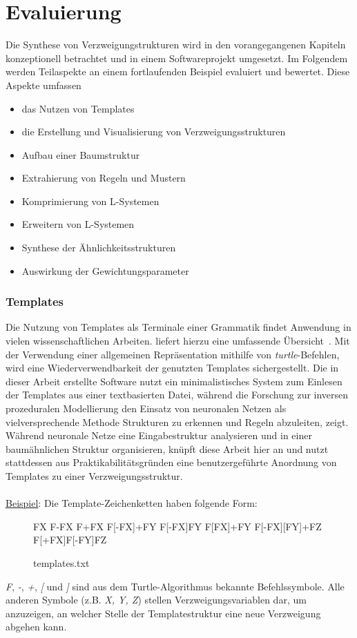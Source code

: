 
\chapter{Evaluierung}
\label{eval}
Die Synthese von Verzweigungstrukturen wird in den vorangegangenen Kapiteln konzeptionell betrachtet
und in einem Softwareprojekt umgesetzt.
Im Folgendem werden Teilaspekte an einem fortlaufenden Beispiel evaluiert und bewertet.
Diese Aspekte umfassen
\begin{itemize}
    \item das Nutzen von Templates
    \item die Erstellung und Visualisierung von Verzweigungsstrukturen
    \item Aufbau einer Baumstruktur
    \item Extrahierung von Regeln und Mustern
    \item Komprimierung von L-Systemen
    \item Erweitern von L-Systemen
    \item Synthese der Ähnlichkeitsstrukturen
    \item Auswirkung der Gewichtungsparameter
\end{itemize}

\subsection*{Templates}
Die Nutzung von Templates als Terminale einer Grammatik findet Anwendung in vielen wissenschaftlichen Arbeiten.
\citeauthor{aliaga_2016} liefert hierzu eine umfassende Übersicht~\cite{aliaga_2016}.
Mit der Verwendung einer allgemeinen Repräsentation mithilfe von \textit{turtle}-Befehlen, wird eine
Wiederverwendbarkeit der genutzten Templates sichergestellt.
Die in dieser Arbeit erstellte Software nutzt ein minimalistisches System zum Einlesen der Templates aus
einer textbasierten Datei, während die Forschung zur inversen prozeduralen Modellierung den Einsatz von
neuronalen Netzen als vielversprechende Methode Strukturen zu erkennen und Regeln abzuleiten, zeigt.\\
Während neuronale Netze eine Eingabestruktur analysieren und in einer baumähnlichen Struktur organisieren,
knüpft diese Arbeit hier an und nutzt stattdessen aus Praktikabilitätsgründen eine benutzergeführte Anordnung
von Templates zu einer Verzweigungsstruktur.\\~\\
\underline{Beispiel}: Die Template-Zeichenketten haben folgende Form:
\begin{figure}[H]
    \centering
    \begin{csource}
    FX
    F-FX
    F+FX
    F[-FX]+FY
    F[-FX]FY
    F[FX]+FY
    F[-FX][FY]+FZ
    F[+FX]F[-FY]FZ
    \end{csource}
    \caption{templates.txt}
\end{figure}
\textit{F}, \textit{-}, \textit{+}, \textit{[} und \textit{]} sind aus dem Turtle-Algorithmus bekannte
Befehlssymbole.
Alle anderen Symbole (z.B. \textit{X, Y, Z}) stellen Verzweigungsvariablen dar, um anzuzeigen, an welcher Stelle
der Templatestruktur eine neue Verzweigung abgehen kann.


